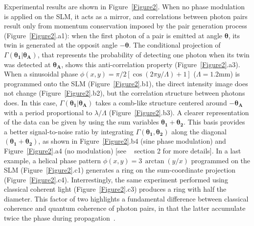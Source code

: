 \documentclass[%
 reprint,
 amsmath,amssymb,
 aps
]{revtex4-1}
\begin{document}
Experimental results are shown in Figure~\ref{Figure2}. When no phase modulation is applied on the SLM, it acts as a mirror, and correlations between photon pairs result only from momentum conservation imposed by the pair generation process (Figure~\ref{Figure2}.a1): when the first photon of a pair is emitted at angle $\boldsymbol{{\theta}}$, its twin is generated at the opposit angle $-\boldsymbol{{\theta}}$. The conditional projection of $\Gamma(\boldsymbol{{\theta_1}}|\boldsymbol{{\theta}_A})$, that represents the probability of detecting one photon when its twin was detected at $\boldsymbol{{\theta_A}}$, shows this anti-correlation property (Figure~\ref{Figure2}.a3). When a sinusoidal phase $\phi(x,y)=\pi/2 \left[ \cos(2 \pi y / \Lambda)+1 \right]$ ($\Lambda = 1.2$mm) is programmed onto the SLM (Figure~\ref{Figure2}.b1), the direct intensity image does not change (Figure~\ref{Figure2}.b2), but the correlation structure between photons does. In this case, $\Gamma(\boldsymbol{{\theta}_1}|\boldsymbol{{\theta_A}})$ takes a comb-like structure centered around $-\boldsymbol{\theta_A}$ with a period proportional to $\lambda/\Lambda$ (Figure~\ref{Figure2}.b3). A clearer representation of the data can be given by using the sum variables $\boldsymbol{{\theta_1}}+\boldsymbol{{\theta_2}}$. This basis provides a better signal-to-noise ratio by integrating $\Gamma(\boldsymbol{{\theta}_1},\boldsymbol{{\theta_2}})$ along the diagonal $(\boldsymbol{{\theta_1}}+\boldsymbol{{\theta_2}})$, as shown in Figure~\ref{Figure2}.b4 (sine phase modulation) and Figure~\ref{Figure2}.a4 (no modulation) [see ~\cite{supmat} section 2 for more details]. In a last example, a helical phase pattern $\phi(x,y)=3 \, \arctan(y/x) $ programmed on the SLM (Figure~\ref{Figure2}.c1) generates a ring on the sum-coordinate projection (Figure~\ref{Figure2}.c4). Interrestingly, the same experiment performed using classical coherent light (Figure~\ref{Figure2}.c3) produces a ring with half the diameter. This factor of two highlights a fundamental difference between classical coherence and quantum coherence of photon pairs, in that the latter accumulate twice the phase during propagation~\cite{brida_experimental_2010}. 
\end{document}
